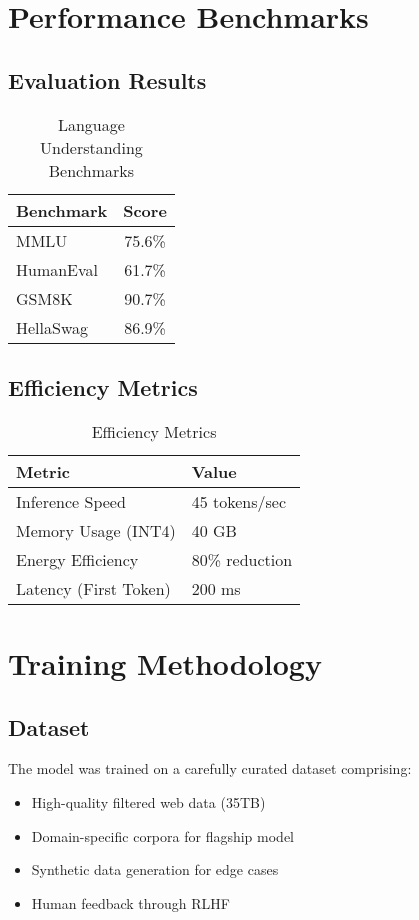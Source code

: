 \documentclass[11pt,a4paper]{article}
\begin{document}
\section{Performance Benchmarks}

\subsection{Evaluation Results}


\begin{table}[H]
\centering
\begin{tabular}{lc}
\toprule
\textbf{Benchmark} & \textbf{Score} \\
\midrule
MMLU & 75.6\% \\
HumanEval & 61.7\% \\
GSM8K & 90.7\% \\
HellaSwag & 86.9\% \\
\bottomrule
\end{tabular}
\caption{Language Understanding Benchmarks}
\end{table}

\subsection{Efficiency Metrics}

\begin{table}[H]
\centering
\begin{tabular}{ll}
\toprule
\textbf{Metric} & \textbf{Value} \\
\midrule
Inference Speed & 45 tokens/sec \\
Memory Usage (INT4) & 40 GB \\
Energy Efficiency & 80\% reduction \\
Latency (First Token) & 200 ms \\
\bottomrule
\end{tabular}
\caption{Efficiency Metrics}
\end{table}

\section{Training Methodology}

\subsection{Dataset}
The model was trained on a carefully curated dataset comprising:
\begin{itemize}
    \item High-quality filtered web data (35TB)
    \item Domain-specific corpora for flagship model
    \item Synthetic data generation for edge cases
    \item Human feedback through RLHF
\end{itemize}
\end{document}
